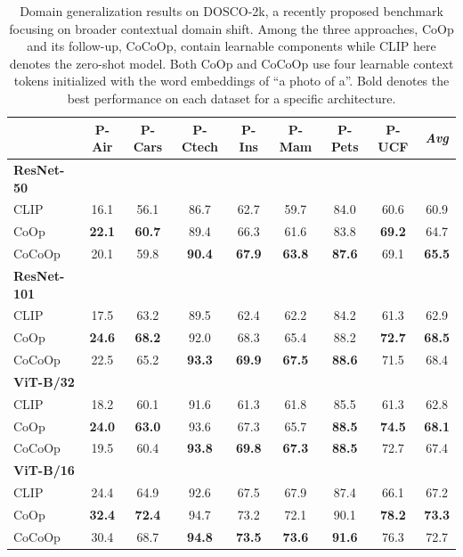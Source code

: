 \documentclass[10pt,twocolumn,letterpaper]{article}
\newcommand{\tableCellHeight}{1}
\newcommand{\tabstyle}[1]{
  \setlength{\tabcolsep}{#1}
  \renewcommand{\arraystretch}{\tableCellHeight}
  \centering
  \small
}
\begin{document}
\begin{table}[t]
    \tabstyle{9pt}
    \caption{Domain generalization results on DOSCO-2k, a recently proposed benchmark focusing on broader contextual domain shift. Among the three approaches, CoOp and its follow-up, CoCoOp, contain learnable components while CLIP here denotes the zero-shot model. Both CoOp and CoCoOp use four learnable context tokens initialized with the word embeddings of ``a photo of a''. Bold denotes the best performance on each dataset for a specific architecture.}
    \label{tab:dosco_2k}
    \begin{tabular}{l cccccccc}
    \toprule
    & P-Air & P-Cars & P-Ctech & P-Ins & P-Mam & P-Pets & P-UCF & \textit{Avg} \\
    \midrule
    \textbf{ResNet-50} & \\
    CLIP & 16.1 & 56.1 & 86.7 & 62.7 & 59.7 & 84.0 & 60.6 & 60.9 \\
    CoOp & \textbf{22.1} & \textbf{60.7} & 89.4 & 66.3 & 61.6 & 83.8 & \textbf{69.2} & 64.7 \\
    CoCoOp & 20.1 & 59.8 & \textbf{90.4} & \textbf{67.9} & \textbf{63.8} &  \textbf{87.6} & 69.1 & \textbf{65.5} \\
    \midrule
    \textbf{ResNet-101} & \\
    CLIP & 17.5 & 63.2 & 89.5 & 62.4 & 62.2 & 84.2 & 61.3 & 62.9 \\
    CoOp & \textbf{24.6} & \textbf{68.2} & 92.0 & 68.3 & 65.4 & 88.2 & \textbf{72.7} & \textbf{68.5} \\
    CoCoOp & 22.5 & 65.2 & \textbf{93.3} & \textbf{69.9} & \textbf{67.5} & \textbf{88.6} & 71.5 & 68.4 \\
    \midrule
    \textbf{ViT-B/32} & \\
    CLIP & 18.2 & 60.1 & 91.6 & 61.3 & 61.8 & 85.5 & 61.3 & 62.8 \\
    CoOp & \textbf{24.0} & \textbf{63.0} & 93.6 & 67.3 & 65.7 & \textbf{88.5} & \textbf{74.5} & \textbf{68.1} \\
    CoCoOp & 19.5 & 60.4 & \textbf{93.8} & \textbf{69.8} & \textbf{67.3} & \textbf{88.5} & 72.7 & 67.4 \\
    \midrule
    \textbf{ViT-B/16} & \\
    CLIP & 24.4 & 64.9 & 92.6 & 67.5 & 67.9 & 87.4 & 66.1 & 67.2 \\
    CoOp & \textbf{32.4} & \textbf{72.4} & 94.7 & 73.2 & 72.1 & 90.1 & \textbf{78.2} & \textbf{73.3} \\
    CoCoOp & 30.4 & 68.7 & \textbf{94.8} & \textbf{73.5} & \textbf{73.6} & \textbf{91.6} & 76.3 & 72.7 \\
    \bottomrule
    \end{tabular}
\end{table}
\end{document}
